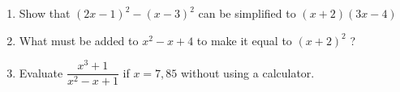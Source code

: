 \begin{eocexercises}{}
\begin{enumerate}[itemsep=5pt, label=\textbf{\arabic*}. ]
\item Show that ${(2x-1)}^{2}-{(x-3)}^{2}$ can be simplified to $(x+2)(3x-4)$

\item What must be added to ${x}^{2}-x+4$ to make it equal to ${(x+2)}^{2}$ ?
\item Evaluate $\dfrac{x^{3}+1}{x^{2}-x+1}$ if $x=7,85$ without using a calculator.
\end{enumerate}

\end{eocexercises}
